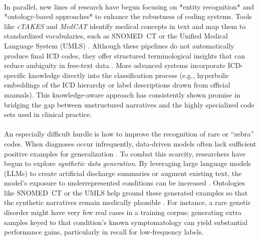 \paragraph{}
In parallel, new lines of research have begun focusing on *entity recognition* and *ontology-based approaches* to enhance the robustness of coding systems. Tools like \emph{cTAKES} \citep{savova2010ctakes} and \emph{MedCAT} \citep{kraljevic2021multi} identify medical concepts in text and map them to standardized vocabularies, such as SNOMED~CT \citep{donnelly2006snomedct} or the Unified Medical Language System (UMLS) \citep{bodenreider2004umls}. Although these pipelines do not automatically produce final ICD codes, they offer structured terminological insights that can reduce ambiguity in free-text data \citep{wu2018semehr}. More advanced systems incorporate ICD-specific knowledge directly into the classification process (e.g., hyperbolic embeddings of the ICD hierarchy \citep{cao2020hypercore} or label descriptions drawn from official manuals). This knowledge-aware approach has consistently shown promise in bridging the gap between unstructured narratives and the highly specialized code sets used in clinical practice.

\paragraph{}
An especially difficult hurdle is how to improve the recognition of rare or “zebra” codes. When diagnoses occur infrequently, data-driven models often lack sufficient positive examples for generalization \citep{rios2018few}. To combat this scarcity, researchers have begun to explore \emph{synthetic data generation}. By leveraging large language models (LLMs) to create artificial discharge summaries or augment existing text, the model’s exposure to underrepresented conditions can be increased \citep{falis2022horsestozebras,falis2024gpt35}. Ontologies like SNOMED~CT or the UMLS help ground these generated examples so that the synthetic narratives remain medically plausible \citep{kumichev2024medsyn}. For instance, a rare genetic disorder might have very few real cases in a training corpus; generating extra samples keyed to that condition’s known symptomatology can yield substantial performance gains, particularly in recall for low-frequency labels.

